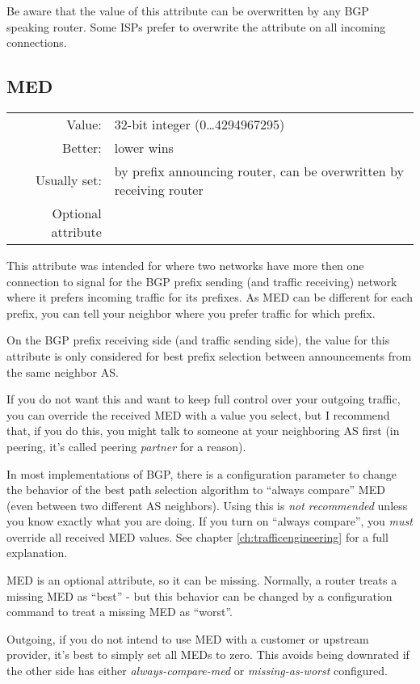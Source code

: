 Be aware that the value of this attribute can be overwritten by any BGP speaking router. Some ISPs prefer to overwrite the attribute on all incoming connections.


\subsection{\acrfull{MED}}
\begin{tabular}{r p{\linewidth}}
Value: & 32-bit integer (0\ldots4294967295)\\
Better: & lower wins \\
Usually set: & by prefix announcing router, can be overwritten by receiving router \\
Optional attribute \\
\end{tabular}

This attribute was intended for where two networks have more then one connection to signal for the BGP prefix sending (and traffic receiving) network where it prefers incoming traffic for its prefixes. As \gls{MED} can be different for each prefix, you can tell your neighbor where you prefer traffic for which prefix.

On the BGP prefix receiving side (and traffic sending side), the value for this attribute is only considered for best prefix selection between announcements from the same neighbor AS.

If you do not want this and want to keep full control over your outgoing traffic, you can override the received MED with a value you select, but I recommend that, if you do this, you might talk to someone at your neighboring AS first (in peering, it's called peering \emph{partner} for a reason).

In most implementations of BGP, there is a configuration parameter to change the behavior of the best path selection algorithm to ``always compare'' MED (even between two different AS neighbors). Using this is \emph{not recommended} unless you know exactly what you are doing. If you turn on ``always compare'', you \emph{must} override all received MED values. See chapter \ref{ch:trafficengineering} for a full explanation.

MED is an optional attribute, so it can be missing. Normally, a router treats a missing MED as ``best'' - but this behavior can be changed by a configuration command to treat a missing MED as ``worst''.

Outgoing, if you do not intend to use MED with a customer or upstream provider, it's best to simply set all MEDs to zero. This avoids being downrated if the other side has either \emph{always-compare-med} or \emph{missing-as-worst} configured.

